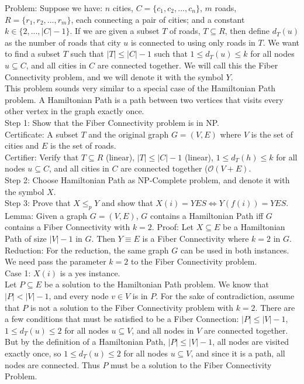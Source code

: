\documentclass{article}
\begin{document}
Problem: Suppose we have: $n$ cities, $C = \{c_1, c_2, ..., c_n\}$, $m$ roads, $R = \{r_1, r_2,..., r_m\}$, each connecting a pair of cities; and a constant $k \in \{2,...,|C|-1\}$. If we are given a subset $T$ of roads, $T \subseteq R$, then define $d_T(u)$ as the number of roads that city $u$ is connected to using only roads in $T$. We want to find a subset $T$ such that $|T| \leq |C|-1$ such that $1 \leq d_T(u) \leq k$ for all nodes $u \subseteq C$, and all cities in $C$ are connected together. We will call this the Fiber Connectivity problem, and we will denote it with the symbol $Y$.\\

This problem sounds very similar to a special case of the Hamiltonian Path problem. A Hamiltonian Path is a path between two vertices that visits every other vertex in the graph exactly once. \\

Step 1: Show that the Fiber Connectivity problem is in NP. \\
Certificate: A subset $T$ and the original graph $G=(V,E)$ where $V$ is the set of cities and $E$ is the set of roads. \\
Certifier: Verify that $T \subseteq R$ (linear), $|T| \leq |C|-1$ (linear), $1 \leq d_T(h) \leq k$ for all nodes $u \subseteq C$, and all cities in $C$ are connected together ($\mathcal{O}(V+E)$.\\

Step 2: Choose Hamiltonian Path as NP-Complete problem, and denote it with the symbol $X$. \\

Step 3: Prove that $X \leq_p Y$ and show that $X(i) = YES \Leftrightarrow Y(f(i))= YES$. \\
Lemma: Given a graph $G=(V,E)$, $G$ contains a Hamiltonian Path iff $G$ contains a Fiber Connectivity with $k=2$.
Proof: Let $X \subseteq E$ be a Hamiltonian Path of size $|V|-1$ in $G$. Then $Y \equiv E$ is a Fiber Connectivity where $k=2$ in $G$. \\
Reduction: For the reduction, the same graph $G$ can be used in both instances. We need pass the parameter $k=2$ to the Fiber Connectivity problem.\\

Case 1: $X(i)$ is a yes instance. \\
Let $P \subseteq E$ be a solution to the Hamiltonian Path problem. We know that $|P|<|V|-1$, and every node $v \in V$ is in $P$. For the sake of contradiction, assume that $P$ is not a solution to the Fiber Connectivity problem with $k=2$. There are a few conditions that must be satisfied to be a Fiber Connection: $|P| \leq |V|-1$, $1 \leq d_T(u) \leq 2$ for all nodes $u \subseteq V$, and all nodes in $V$ are connected together. But by the definition of a Hamiltonian Path, $|P| \leq |V|-1$, all nodes are visited exactly once, so $1 \leq d_T(u) \leq 2$ for all nodes $u \subseteq V$, and since it is a path, all nodes are connected. Thus $P$ must be a solution to the Fiber Connectivity Problem.\\
\end{document}
